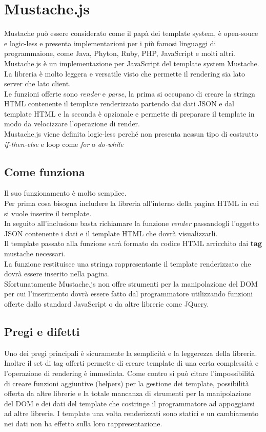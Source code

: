 \section{Mustache.js}
Mustache può essere considerato come il papà dei template system, è open-souce e logic-less e presenta implementazioni per i più famosi linguaggi di programmaione, come Java, Phyton, Ruby, PHP, JavaScript e molti altri.\\
Mustache.js è un implementazione per JavaScript del template system Mustache.\\
La libreria è molto leggera e versatile visto che permette il rendering sia lato server che lato client.\\
Le funzioni offerte sono \textit{render} e \textit{parse}, la prima si occupano di creare la stringa HTML contenente il template renderizzato partendo dai dati JSON e dal template HTML e la seconda è opzionale e permette di preparare il template in modo da velocizzare l'operazione di render.\\
Mustache.js viene definita logic-less perché non presenta nessun tipo di costrutto \textit{if-then-else} e loop come \textit{for} o \textit{do-while}
\subsection{Come funziona}
Il suo funzionamento è molto semplice.\\
Per prima cosa bisogna includere la libreria all'interno della pagina HTML in cui si vuole inserire il template.\\
In seguito all'inclusione basta richiamare la funzione \textit{render} passandogli l'oggetto JSON contenente i dati e il template HTML che dovrà visualizzarli.\\
Il template passato alla funzione sarà formato da codice HTML arricchito dai \textbf{tag} mustache necessari.\\
La funzione restituisce una stringa rappresentante il template renderizzato che dovrà essere inserito nella pagina.\\
Sfortunatamente Mustache.js non offre strumenti per la manipolazione del DOM per cui l'inserimento dovrà essere fatto dal programmatore utilizzando funzioni offerte dallo standard JavaScript o da altre librerie come JQuery.
\subsection{Pregi e difetti}
Uno dei pregi principali è sicuramente la semplicità e la leggerezza della libreria.
Inoltre il set di tag offerti permette di creare template di una certa complessità e l'operazione di rendering è immediata.
Come contro si può citare l'impossibilità di creare funzioni aggiuntive (helpers) per la gestione dei template, possibilità offerta da altre librerie e la totale mancanza di strumenti per la manipolazione del DOM e dei dati del template che costringe il programmatore ad appoggiarsi ad altre librerie.
I template una volta renderizzati sono statici e un cambiamento nei dati non ha effetto sulla loro rappresentazione.
